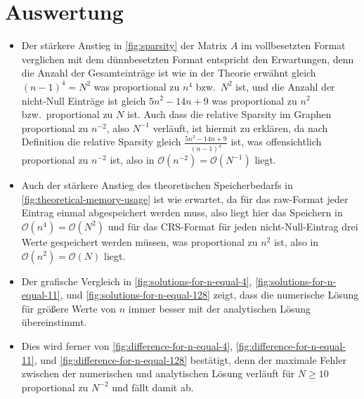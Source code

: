 \documentclass{scrartcl}
\newcommand\BigO{\mathcal{O}}
\begin{document}
\section{Auswertung}

\begin{itemize}
    \item Der stärkere Anstieg in \autoref{fig:sparsity} der Matrix \(A\) im
          vollbesetzten Format verglichen mit dem dünnbesetzten Format
          entspricht den Erwartungen, denn die Anzahl der Gesamteinträge ist
          wie in der Theorie erwähnt gleich \({(n - 1)}^4 = N^2\) was
          proportional zu \(n^4\) bzw.\ \(N^2\) ist, und die Anzahl der
          nicht-Null Einträge ist gleich \(5n^2 - 14n + 9\) was proportional zu
          \(n^2\) bzw.\ proportional zu \(N\) ist. Auch dass die relative
          Sparsity im Graphen proportional zu \(n^{-2}\), also \(N^{-1}\)
          verläuft, ist hiermit zu erklären, da nach Definition die relative
          Sparsity gleich \(\frac{5n^2 - 14n + 9}{{(n - 1)}^4}\) ist, was
          offensichtlich proportional zu \(n^{-2}\) ist, also in
          \(\BigO(n^{-2}) = \BigO(N^{-1})\) liegt.

    \item Auch der stärkere Anstieg des theoretischen Speicherbedarfs in
          \autoref{fig:theoretical-memory-usage} ist wie erwartet, da für das
          raw-Format jeder Eintrag einmal abgespeichert werden muss, also liegt
          hier das Speichern in \(\BigO(n^4) = \BigO(N^2)\) und für das
          CRS-Format für jeden nicht-Null-Eintrag drei Werte gespeichert werden
          müssen, was proportional zu \(n^2\) ist, also in \(\BigO(n^2) =
          \BigO(N)\) liegt.

    \item Der grafische Vergleich in \autoref{fig:solutions-for-n-equal-4},
          \autoref{fig:solutions-for-n-equal-11}, und
          \autoref{fig:solutions-for-n-equal-128} zeigt, dass die numerische
          Lösung für größere Werte von \(n\) immer besser mit der analytischen
          Lösung übereinstimmt.

    \item Dies wird ferner von \autoref{fig:difference-for-n-equal-4},
          \autoref{fig:difference-for-n-equal-11}, und
          \autoref{fig:difference-for-n-equal-128} bestätigt, denn der maximale
          Fehler zwischen der numerischen und analytischen Lösung verläuft für
          \(N \geqslant 10\) proportional zu \(N^{-2}\) und fällt damit ab.


\end{itemize}
\end{document}
